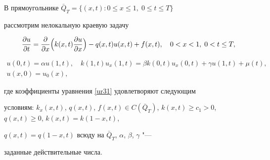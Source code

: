  В прямоугольнике \mbox{$\bar Q_T=\bigl\{(x,t):0\leq x\leq 1, \; 0\leq t\leq T \bigr \}$ }

рассмотрим нелокальную краевую задачу

\begin{equation}

\frac{\partial u}{\partial t}=\frac{\partial}{\partial

x}\Bigl(k(x,t)\frac{\partial u}{\partial x}\Bigr)-q(x,t)u(x,t)+f(x,t), \quad 0<x<1, \; 0<t\leq T,

\label{ur31}

\end{equation}

\begin{equation}

\begin{array}{c}

u(0, t)=\alpha u(1, t),\quad k(1,t)u_x(1,t)=\beta k(0,t)u_x(0, t)+\gamma u(1,t)+\mu(t), \\ u(x, 0)=u_0(x), 

\end{array}

 \label{ur32}

\end{equation}

где коэффициенты уравнения \eqref{ur31} удовлетворяют следующим

условиям: \linebreak $k_x(x,t)$, $q(x,t)$, $f(x,t)\in C{(\bar Q_T)}$, $

k(x,t)\geq c_1>0$, $q(x,t)\geq0$, $k(x,t)=k(1-x,t)$,

$q(x,t)=q(1-x,t)$ всюду на $\bar Q_T$, $\alpha$, $\beta$, $\gamma$ "---

заданные действительные числа.



